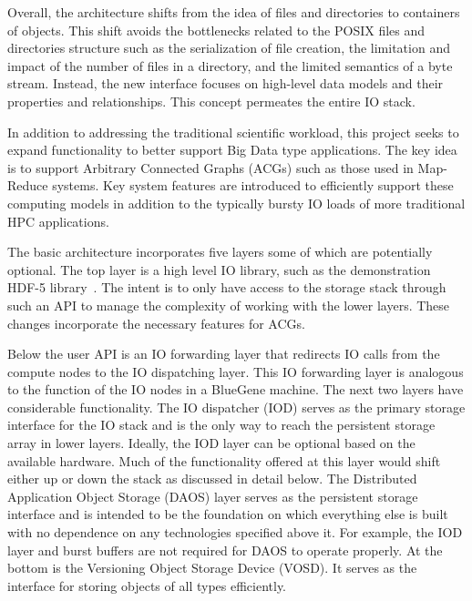 \documentclass[conference]{IEEEtran}
\begin{document}
Overall, the architecture shifts from the idea of files and directories to
containers of objects. This shift avoids the bottlenecks related to the POSIX
files and directories structure such as the serialization of file creation, the
limitation and impact of the number of files in a directory, and the limited
semantics of a byte stream. Instead, the new interface focuses on high-level
data models and their properties and relationships. This concept permeates the
entire IO stack.

In addition to addressing the traditional scientific workload, this project
seeks to expand functionality to better support Big Data type applications. The
key idea is to support Arbitrary Connected Graphs (ACGs) such as those used in
Map-Reduce systems. Key system features are introduced to efficiently support
these computing models in addition to the typically bursty IO loads of more
traditional HPC applications.

The basic architecture incorporates five layers some of which are potentially
optional. The top layer is a high level IO library, such as the demonstration
HDF-5 library~\cite{hdf5}. The intent is to only have access to the storage
stack through such an API to manage the complexity of working with the lower
layers. These changes incorporate the necessary features for ACGs.

Below the user API is an IO forwarding layer that redirects IO calls from the
compute nodes to the IO dispatching layer.  This IO forwarding layer is
analogous to the function of the IO nodes in a BlueGene machine. The next two
layers have considerable functionality. The IO dispatcher (IOD) serves as the
primary storage interface for the IO stack and is the only way to reach the
persistent storage array in lower layers. Ideally, the IOD layer can be
optional based on the available hardware. Much of the functionality offered at
this layer would shift either up or down the stack as discussed in detail
below. The Distributed Application Object
Storage (DAOS) layer serves as the persistent storage interface and is intended
to be the foundation on which everything else is built with no dependence on
any technologies specified above it. For example, the IOD layer and burst
buffers are not required for DAOS to operate properly. At the bottom is the
Versioning Object Storage Device (VOSD).  It serves as the interface for
storing objects of all types efficiently.
\end{document}
